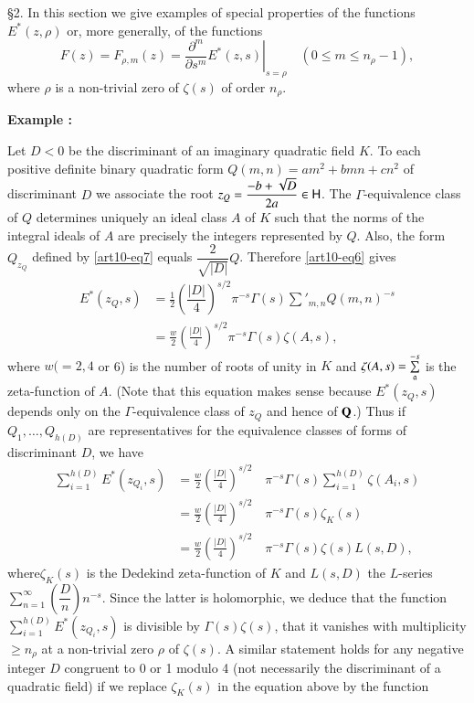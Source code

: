 \S 2. In this section we give examples of special properties of the functions $E^\ast(z, \rho)$ or, more generally, of the functions 
\begin{equation*}
\left. F(z) = F_{\rho, m} (z) = \frac{\partial^m}{\partial s^m} E^\ast (z,s) \right|_{s = \rho} \quad (0 \leq m \leq n_\rho -1), 
\tag{19}\label{art10-eq19}
\end{equation*}
where $\rho$ is a non-trivial zero of $\zeta(s)$ of order $n_\rho$.

\medskip
\noindent
{\bfseries Example :\label{art10-exam1}}


Let $D < 0 $ be the discriminant of an imaginary quadratic field $K$. To each positive definite binary quadratic form $Q(m,n)= am^2 + b mn+ cn^2$ of discriminant $D$ we associate the root $z_Q  = \dfrac{-b+ \sqrt{D}}{2a} \in \mathsf{H}$. The $\Gamma$-equivalence class of $Q$ determines uniquely an ideal class $A$ of $K$ such that the norms of the integral ideals of $A$ are precisely the integers represented by $Q$. Also, the form $Q_{z_Q}$ defined by \eqref{art10-eq7} equals $\dfrac{2}{\sqrt{|D|}} Q$. Therefore \eqref{art10-eq6} gives 
\begin{align*}
E^\ast (z_Q , s) & = \frac{1}{2} \left(\dfrac{|D|}{4} \right)^{s/2} \pi^{-s} \Gamma (s) \sum\limits'_{m,n} Q (m,n)^{-s} \\
& = \frac{w}{2} \left(\frac{|D|}{4} \right)^{s/2} \pi^{-s} \Gamma (s) \zeta (A, s), 
\end{align*}
where $w (= 2, 4$ or 6) is the number of roots of unity in $K$ and $\zeta (A, s) = \sum\limits_{\mathfrak{a}}^{-s}$  is the zeta-function of $A$. (Note that this equation makes sense because $E^\ast (z_Q, s)$ depends only on the $\Gamma$-equivalence class of $z_Q$ and hence of $\mathbf{Q}$.) Thus if $Q_1, \ldots, Q_{h(D)}$ are representatives for the equivalence classes of forms of discriminant $D$, we have 
\begin{align*}
\sum\limits^{h(D)}_{i=1} E^\ast (z_{Q_i}, s) & = \frac{w}{2} \left(\frac{|D|}{4} \right)^{s/2} \quad \pi^{-s} \Gamma (s) \sum\limits^{h(D)}_{i=1} \zeta (A_i,s)\\
& = \frac{w}{2} \left(\frac{|D|}{4} \right)^{s/2} \quad \pi^{-s} \Gamma (s) \zeta_K (s) \\
& = \frac{w}{2} \left(\frac{|D|}{4} \right)^{s/2} \quad \pi^{-s} \Gamma (s) \zeta (s) L(s, D),
\end{align*}
where\pageoriginale $\zeta_K (s)$ is the Dedekind zeta-function of $K$ and $L(s,D)$ the $L$-series $\sum\limits^\infty_{n=1}\left(\dfrac{D}{n}\right) n^{-s}$. Since the latter is holomorphic, we deduce that the function $\sum\limits^{h(D)}_{i=1} E^{\ast} (z_{Q_i}, s)$ is divisible by $\Gamma (s) \zeta (s)$, \ie that it vanishes with multiplicity $\geq n_\rho$ at a non-trivial zero $\rho$ of $\zeta (s)$. A similar statement holds for any negative integer $D$ congruent to 0 or 1 modulo 4 (not necessarily the discriminant of a quadratic field) if we replace $\zeta_K (s)$ in the equation above by the function 
